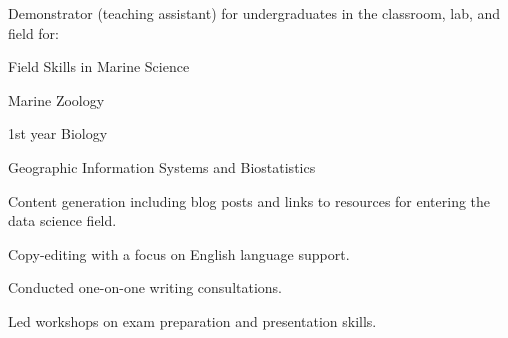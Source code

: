 \documentclass[a4paper]{deedy-resume} %
\begin{document}
\begin{flushleft}


\sectionspace
\sectionspace


Demonstrator (teaching assistant) for undergraduates in the classroom, lab, and field for:
\begin{tightitemize}
\item Field Skills in Marine Science
\item Marine Zoology
\item 1st year Biology
\item Geographic Information Systems and Biostatistics
\end{tightitemize}


\sectionspace


Content generation including blog posts and links to resources for entering the data science field.

\sectionspace



Copy-editing with a focus on English language support.

\sectionspace



\begin{tightitemize}
\item Conducted one-on-one writing consultations.
\item Led workshops on exam preparation and presentation skills.
\end{tightitemize}

\sectionspace %


\end{flushleft}
\end{document}
